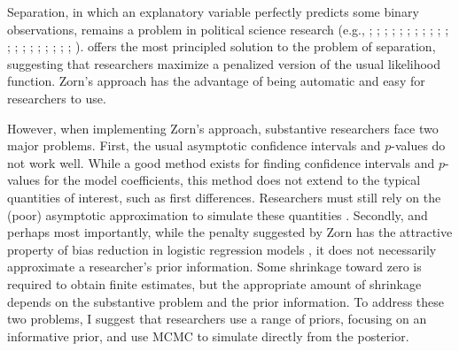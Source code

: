 \documentclass[12pt]{article}
\begin{document}
\newpage
\doublespace

Separation, in which an explanatory variable perfectly predicts some binary observations, remains a problem in political science research (e.g., \citealt{BellMiller2015}; \citealt{Mares2015}; \citealt{ViningWilhelmCollens2015}; \citealt{BrownKaplow2014}; \citealt{BarrilleauxRainey2014};  \citealt{LeemanMares2014}; \citealt{Reiter2014}; \citealt{Weisiger2014}; \citealt{MinozziVolden2013}; \citealt{CedermeanGleditschHug2013}; \citealt{Fuhrmann2012}; \citealt{RoccaSanchezMorin2011}; \citealt{PetersonDrury2011}; \citealt{CoxKousserMcCubbins2010}; \citealt{Ahlquist2010}; \citealt{Rauchhaus2009}; \citealt{SmithFridkin2008}; \citealt{Casellas2008}; \citealt{DesposatoScheiner2008}; \citealt{HellerMershon2008}; \citealt{DeRouenBercovitch2008}).
\cite{Zorn2005} offers the most principled solution to the problem of separation, suggesting that researchers maximize a penalized version of the usual likelihood function. 
Zorn's approach has the advantage of being automatic and easy for researchers to use.

However, when implementing Zorn's approach, substantive researchers face two major problems. 
First, the usual asymptotic confidence intervals and $p$-values do not work well. 
While a good method exists for finding confidence intervals and $p$-values for the model coefficients, this method does not extend to the typical quantities of interest, such as first differences. 
Researchers must still rely on the (poor) asymptotic approximation to simulate these quantities \citep{KingTomzWittenberg2000}.  
Secondly, and perhaps most importantly, while the penalty suggested by Zorn has the attractive property of bias reduction in logistic regression models \citep{Firth1993}, it does not necessarily approximate a researcher's prior information. 
Some shrinkage toward zero is required to obtain finite estimates, but the appropriate amount of shrinkage depends on the substantive problem and the prior information. 
To address these two problems, I suggest that researchers use a range of priors, focusing on an informative prior, and use MCMC to simulate directly from the posterior.
\end{document}
